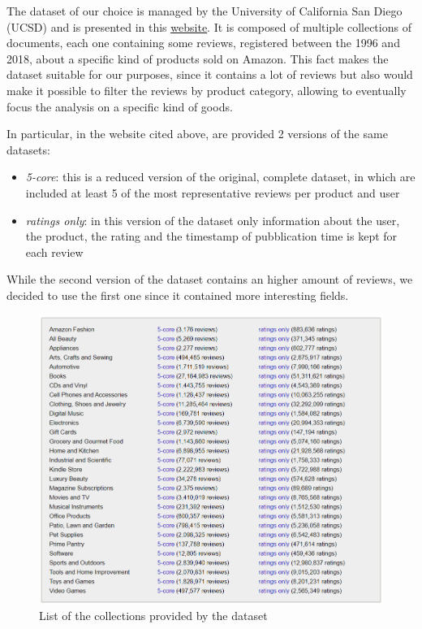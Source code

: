 The dataset of our choice is managed by the University of California San Diego (UCSD) and is presented in this \href{https://nijianmo.github.io/amazon/index.html}{\color{blue}\underline{website}}.
It is composed of multiple collections of documents, each one containing some reviews, registered between the 1996 and 2018, about a specific kind of products sold on Amazon. 
This fact makes the dataset suitable for our purposes, since it contains a lot of reviews but also would make it possible to filter the reviews by product category, allowing to eventually focus the analysis on a specific kind of goods.

In particular, in the website cited above, are provided 2 versions of the same datasets:
\begin{itemize}
    \item \textit{5-core}: this is a reduced version of the original, complete dataset, in which are included at least 5 of the most representative reviews per product and user
    \item \textit{ratings only}: in this version of the dataset only information about the user, the product, the rating and the timestamp of pubblication time is kept for each review
\end{itemize}
While the second version of the dataset contains an higher amount of reviews, we decided to use the first one since it contained more interesting fields.

\begin{figure}[H]
    \centering
    \includegraphics[scale=0.5]{Images/collections.png}
    \caption{List of the collections provided by the dataset}
\end{figure}


